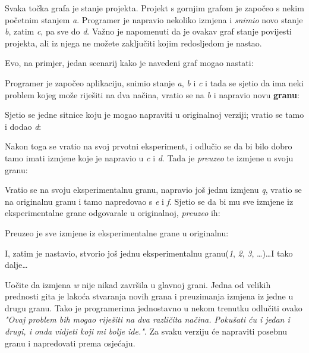 

Svaka točka grafa je stanje projekta. 
Projekt s gornjim grafom je započeo s nekim početnim stanjem \emph a.
Programer je napravio nekoliko izmjena i \emph{snimio} novo stanje \emph b, zatim \emph c, pa sve do \emph d.
Važno je napomenuti da je ovakav graf stanje povijesti projekta, ali iz njega ne možete zaključiti kojim redosljedom je nastao.

Evo, na primjer, jedan scenarij kako je navedeni graf mogao nastati:



Programer je započeo aplikaciju, snimio stanje \emph a, \emph b i \emph c i tada se sjetio da ima neki problem kojeg može riješiti na dva načina, vratio se na \emph b i napravio novu \textbf{granu}:



Sjetio se jedne sitnice koju je mogao napraviti u originalnoj verziji; vratio se tamo i dodao \emph d:



Nakon toga se vratio na svoj prvotni eksperiment, i odlučio se da bi bilo dobro tamo imati izmjene koje je napravio u \emph c i \emph d.
Tada je \emph{preuzeo} te izmjene u svoju granu:



Vratio se na svoju eksperimentalnu granu, napravio još jednu izmjenu \emph q, vratio se na originalnu granu i tamo napredovao s \emph e i \emph f. 
Sjetio se da bi mu sve izmjene iz eksperimentalne grane odgovarale u originalnoj, \emph{preuzeo} ih:



Preuzeo je sve izmjene iz eksperimentalne grane u originalnu:



I, zatim je nastavio, stvorio još jednu eksperimentalnu granu(\emph 1, \emph 2, \emph 3, \dots)\dots I tako dalje\dots



Uočite da izmjena \emph w nije nikad završila u glavnoj grani. 
Jedna od velikih prednosti gita je lakoća stvaranja novih grana i preuzimanja izmjena iz jedne u drugu granu. 
Tako je programerima jednostavno u nekom trenutku odlučiti ovako \emph{"Ovaj problem bih mogao riješiti na dva različita načina. Pokušati ću i jedan i drugi, i onda vidjeti koji mi bolje ide."}. Za svaku verziju će napraviti posebnu granu i napredovati prema osjećaju.

